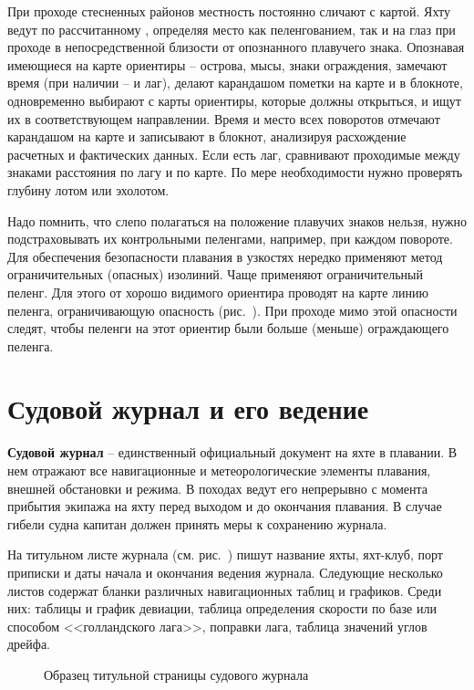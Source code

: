 При проходе стесненных районов местность постоянно сличают с
картой. Яхту ведут по рассчитанному \KK, определяя место как
пеленгованием, так и на глаз при проходе в непосредственной близости
от опознанного плавучего знака. Опознавая имеющиеся на карте ориентиры
\--- острова, мысы, знаки ограждения, замечают время (при наличии \---
и лаг), делают карандашом пометки на карте и в блокноте, одновременно
выбирают с карты ориентиры, которые должны открыться, и ищут их в
соответствующем направлении. Время и место всех поворотов отмечают
карандашом на карте и записывают в блокнот, анализируя расхождение
расчетных и фактических данных. Если есть лаг, сравнивают проходимые
между знаками расстояния по лагу и по карте. По мере необходимости
нужно проверять глубину лотом или эхолотом.

Надо помнить, что слепо полагаться на положение плавучих знаков
нельзя, нужно подстраховывать их контрольными пеленгами, например, при
каждом повороте. Для обеспечения безопасности плавания в узкостях
нередко применяют метод ограничительных (опасных) изолиний. Чаще
применяют ограничительный пеленг. Для этого от хорошо видимого
ориентира проводят на карте линию пеленга, ограничивающую опасность
(рис.~). При проходе мимо этой опасности следят, чтобы
пеленги на этот ориентир были больше (меньше) ограждающего пеленга.

\section{Судовой журнал и его ведение}

\textbf{Судовой журнал} \--- единственный официальный документ на яхте
в плавании. В нем отражают все навигационные и метеорологические
элементы плавания, внешней обстановки и режима. В походах ведут его
непрерывно с момента прибытия экипажа на яхту перед выходом и до
окончания плавания. В случае гибели судна капитан должен принять меры
к сохранению журнала.
 
На титульном листе журнала (см. рис.~) пишут название
яхты, яхт-клуб, порт приписки и даты начала и окончания ведения
журнала. Следующие несколько листов содержат бланки различных
навигационных таблиц и графиков. Среди них: таблицы и график девиации,
таблица определения скорости по базе или способом <<голландского
лага>>, поправки лага, таблица значений углов дрейфа.

\begin{figure}[htb]
  \centering{}
  \caption{Образец титульной страницы судового журнала}
  \label{fig:j-title}
\end{figure} 

